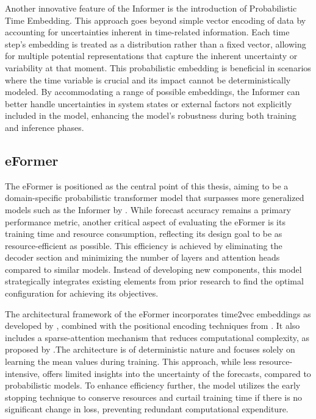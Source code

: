 \documentclass{article}
\begin{document}
Another innovative feature of the Informer is the introduction of Probabilistic Time Embedding. This approach goes beyond simple vector encoding of data by accounting for uncertainties inherent in time-related information. Each time step's embedding is treated as a distribution rather than a fixed vector, allowing for multiple potential representations that capture the inherent uncertainty or variability at that moment. This probabilistic embedding is beneficial in scenarios where the time variable is crucial and its impact cannot be deterministically modeled. By accommodating a range of possible embeddings, the Informer can better handle uncertainties in system states or external factors not explicitly included in the model, enhancing the model’s robustness during both training and inference phases.


\subsection{eFormer}

The eFormer is positioned as the central point of this thesis, aiming to be a domain-specific probabilistic transformer model that surpasses more generalized models such as the Informer by \cite{Informer}. While forecast accuracy remains a primary performance metric, another critical aspect of evaluating the eFormer is its training time and resource consumption, reflecting its design goal to be as resource-efficient as possible. This efficiency is achieved by eliminating the decoder section and minimizing the number of layers and attention heads compared to similar models. Instead of developing new components, this model strategically integrates existing elements from prior research to find the optimal configuration for achieving its objectives.

The architectural framework of the eFormer incorporates time2vec embeddings as developed by \cite{time2vec}, combined with the positional encoding techniques from \cite{vanilla-transformer}. It also includes a sparse-attention mechanism that reduces computational complexity, as proposed by \cite{Informer}.The architecture is of deterministic nature and focuses solely on learning the mean values during training. This approach, while less resource-intensive, offers limited insights into the uncertainty of the forecasts, compared to probabilistic models. To enhance efficiency further, the model utilizes the early stopping technique to conserve resources and curtail training time if there is no significant change in loss, preventing redundant computational expenditure.
\end{document}
